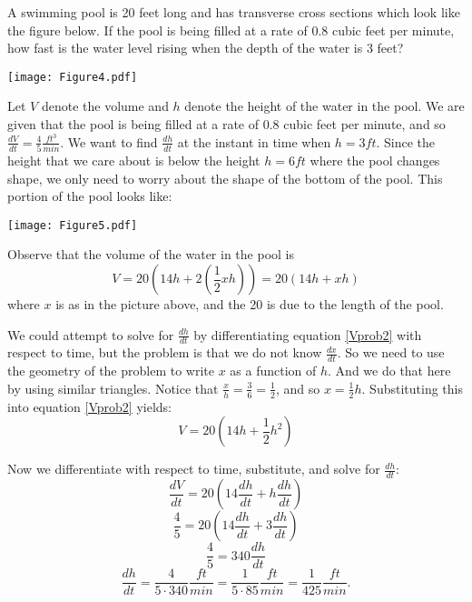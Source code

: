 \documentclass[handout,nooutcomes]{ximera}
\newcommand{\dd}[2][]{\frac{d #1}{d #2}}
\renewenvironment{freeResponse}{
\ifhandout\setbox0\vbox\bgroup\else
\begin{trivlist}\item[\hskip \labelsep\bfseries Solution:\hspace{2ex}]
\fi}
{\ifhandout\egroup\else
\end{trivlist}
\fi}
\begin{document}
\begin{problem}
A swimming pool is 20 feet long and has transverse cross sections which look like the figure below.   If the pool is being filled at a rate of 0.8 cubic feet per minute, how fast is the water level rising when the depth of the water is 3 feet? 
	\begin{image}
	\texttt{[image: Figure4.pdf]}
	\end{image}
	
		\begin{freeResponse}
		Let $V$ denote the volume and $h$ denote the height of the water in the pool.  We are given that the pool is being filled at a rate of $0.8$ cubic feet per minute, and so $\dd[V]{t} = \frac{4}{5} \frac{ft^3}{min}$.  We want to find $\dd[h]{t}$ at the instant in time when $h=3 ft$.  Since the height that we care about is below the height $h=6 ft$ where the pool changes shape, we only need to worry about the shape of the bottom of the pool.  This portion of the pool looks like:
		
		\begin{image}
		\texttt{[image: Figure5.pdf]}
		\end{image}
		
		Observe that the volume of the water in the pool is
		\begin{equation}\label{Vprob2}
		V = 20 \left( 14h + 2 \left( \frac{1}{2} xh \right) \right) = 20 \left( 14h + xh \right)
		\end{equation}
		where $x$ is as in the picture above, and the 20 is due to the length of the pool.  
		
		We could attempt to solve for $\dd[h]{t}$ by differentiating equation \ref{Vprob2} with respect to time, but the problem is that we do not know $\dd[x]{t}$.  So we need to use the geometry of the problem to write $x$ as a function of $h$.  And we do that here by using similar triangles.  Notice that $\frac{x}{h} = \frac{3}{6} = \frac{1}{2}$, and so $x = \frac{1}{2} h$.  Substituting this into equation \ref{Vprob2} yields:
		$$ V = 20 \left( 14h + \frac{1}{2} h^2 \right) $$
		
		Now we differentiate with respect to time, substitute, and solve for $\dd[h]{t}$:
		$$ \dd[V]{t} = 20 \left( 14 \dd[h]{t} + h \dd[h]{t} \right) $$
		$$ \frac{4}{5} = 20 \left( 14 \dd[h]{t} + 3 \dd[h]{t} \right) $$
		$$ \frac{4}{5} = 340 \dd[h]{t} $$
		$$ \dd[h]{t} = \frac{4}{5 \cdot 340} \frac{ft}{min} = \frac{1}{5 \cdot 85} \frac{ft}{min} = \frac{1}{425} \frac{ft}{min}. $$
		
		\end{freeResponse}
		
		
		

\end{problem}
\end{document}
